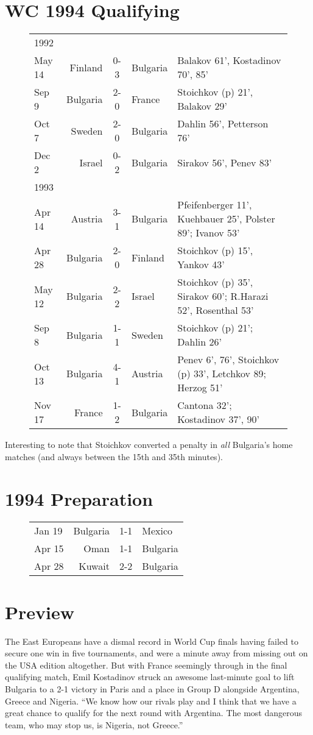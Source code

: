 \section{WC 1994 Qualifying}
\begin{figure}[H]
\begin{tabular}{l r c l l}
1992 & & & & \\
May 14 & Finland & 0-3 & Bulgaria & Balakov 61', Kostadinov 70', 85' \\
Sep 9 & Bulgaria & 2-0 & France & Stoichkov (p) 21', Balakov 29' \\
Oct 7 & Sweden & 2-0 & Bulgaria & Dahlin 56', Petterson 76' \\
Dec 2 & Israel & 0-2 & Bulgaria & Sirakov 56', Penev 83' \\
1993 & & & & \\
Apr 14 & Austria & 3-1 & Bulgaria & Pfeifenberger 11', Kuehbauer 25', Polster 89'; Ivanov 53' \\
Apr 28 & Bulgaria & 2-0 & Finland & Stoichkov (p) 15', Yankov 43' \\
May 12 & Bulgaria & 2-2 & Israel & Stoichkov (p) 35', Sirakov 60'; R.Harazi 52', Rosenthal 53' \\
Sep 8 & Bulgaria & 1-1 & Sweden & Stoichkov (p) 21'; Dahlin 26' \\
Oct 13 & Bulgaria & 4-1 & Austria & Penev 6', 76', Stoichkov (p) 33', Letchkov 89;  Herzog 51' \\
Nov 17 & France & 1-2 & Bulgaria & Cantona 32'; Kostadinov 37', 90' \\
\end{tabular}
\end{figure}
Interesting to note that Stoichkov converted a penalty in \textit{all} Bulgaria's
home matches (and always between the 15th and 35th minutes).
\section{1994 Preparation}
\begin{figure}[H]
\begin{tabular}{l r c l}
Jan 19 & Bulgaria & 1-1 & Mexico \\
Apr 15 & Oman & 1-1 & Bulgaria \\
Apr 28 & Kuwait & 2-2 & Bulgaria \\
\end{tabular}
\end{figure}
\section{Preview}
The East Europeans have a dismal record in World Cup finals having failed to
secure one win in five tournaments, and were a minute away from missing out on 
the USA edition altogether. But with France seemingly through in the final 
qualifying match, Emil Kostadinov struck an awesome last-minute goal to lift 
Bulgaria to a 2-1 victory in Paris and a place in Group D alongside Argentina, 
Greece and Nigeria. ``We know how our rivals play and I think that we have a 
great chance to qualify for the next round with Argentina. The most dangerous 
team, who may stop us, is Nigeria, not Greece.''

